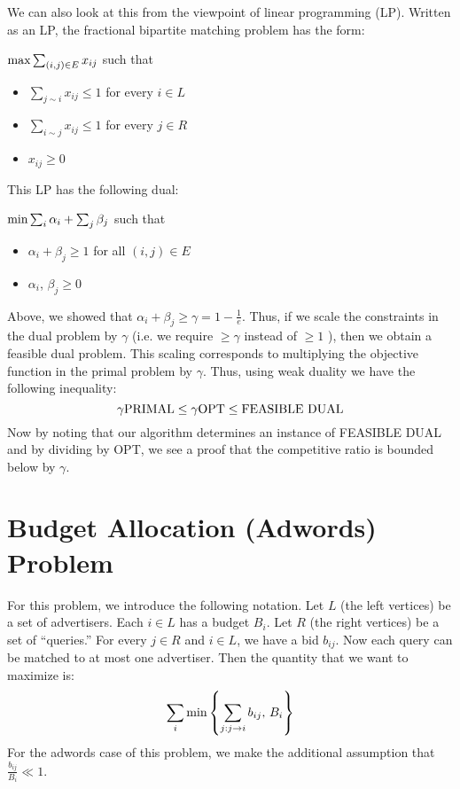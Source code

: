 \documentclass{amsart}
\theoremstyle{definition}
\theoremstyle{remark}
\begin{document}
We can also look at this from the viewpoint of linear programming (LP).  Written as an LP, the fractional bipartite matching problem has the form:

$\textup{max} \sum_{(i,j) \in E} x_{ij}$ such that 
\begin{itemize}
\item $\sum_{j \sim i} x_{ij} \leq 1$ for every $i \in L$
\item $\sum_{i \sim j} x_{ij} \leq 1$ for every $j \in R$
\item $x_{ij} \geq 0$
\end{itemize}

This LP has the following dual:

$\textup{min} \sum_i \alpha_i + \sum_j \beta_j$ such that
\begin{itemize}
\item $\alpha_i + \beta_j \geq 1$ for all $(i,j) \in E$
\item $\alpha_i$, $\beta_j \geq 0$
\end{itemize}

Above, we showed that $\alpha_i + \beta_j \geq \gamma = 1 - \frac{1}{e}$.  Thus, if we scale the constraints in the dual problem by $\gamma$ (i.e. we require $\geq \gamma$ instead of $\geq 1$ ), then we obtain a feasible dual problem.  This scaling corresponds to multiplying the objective function in the primal problem by $\gamma$.  Thus, using weak duality we have the following inequality: 
\[ \gamma \textup{PRIMAL} \leq \gamma \textup{OPT} \leq \textup{FEASIBLE DUAL} \]
Now by noting that our algorithm determines an instance of FEASIBLE DUAL and by dividing by OPT, we see a proof that the competitive ratio is bounded below by $\gamma$.

\section{Budget Allocation (Adwords) Problem}

For this problem, we introduce the following notation.  Let $L$ (the left vertices) be a set of advertisers.  Each $i \in L$ has a budget $B_i$.  Let $R$ (the right vertices) be a set of ``queries.''  For every $j \in R$ and $i \in L$, we have a bid $b_{ij}$.  Now each query can be matched to at most one advertiser.  Then the quantity that we want to maximize is:
\[ \sum_i \textup{min}\left\{ \sum_{j: j\rightarrow i} b_{ij}, \, B_i \right\} \]
For the adwords case of this problem, we make the additional assumption that $\frac{b_{ij}}{B_i} \ll 1$.
\end{document}
